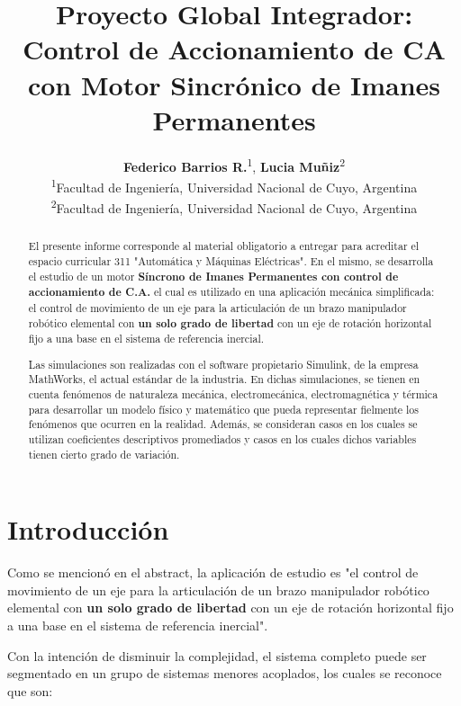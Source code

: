 \documentclass[blue,fullpaper]{ludusofficial}  %
\title{Proyecto Global Integrador: Control de Accionamiento de CA con Motor Sincrónico de Imanes Permanentes}
\author{%
    \textbf{Federico Barrios R.}\textsuperscript{1}, \textbf{Lucia Muñiz}\textsuperscript{2}\\[0.2cm]
    \mdseries\small\textsuperscript{1}Facultad de Ingeniería, Universidad Nacional de Cuyo, Argentina\\
    \small\textsuperscript{2}Facultad de Ingeniería, Universidad Nacional de Cuyo, Argentina \\
}
\begin{document}
\begin{abstract}
El presente informe corresponde al material obligatorio a entregar para acreditar el espacio curricular 311 "Automática y Máquinas Eléctricas". En el mismo, se desarrolla el estudio de un motor \textbf{Síncrono de Imanes Permanentes con control de accionamiento de C.A.} el cual es utilizado en una aplicación mecánica simplificada: el control de movimiento de un eje para la articulación de un brazo manipulador robótico elemental con \textbf{un solo grado de libertad} con un eje de rotación horizontal fijo a una base en el sistema de referencia inercial.

Las simulaciones son realizadas con el software propietario Simulink, de la empresa MathWorks, el actual estándar de la industria. En dichas simulaciones, se tienen en cuenta fenómenos de naturaleza mecánica, electromecánica, electromagnética y térmica para desarrollar un modelo físico y matemático que pueda representar fielmente los fenómenos que ocurren en la realidad. Además, se consideran casos en los cuales se utilizan coeficientes descriptivos promediados y casos en los cuales dichos variables tienen cierto grado de variación.

\end{abstract}


\maketitle

\onecolumn
\tableofcontents
\clearpage

\clearpage
\section{Introducción}

Como se mencionó en el abstract, la aplicación de estudio es "el control de movimiento de un eje para la articulación de un brazo manipulador robótico elemental con \textbf{un solo grado de libertad} con un eje de rotación horizontal fijo a una base en el sistema de referencia inercial".

Con la intención de disminuir la complejidad, el sistema completo puede ser segmentado en un grupo de sistemas menores acoplados, los cuales se reconoce que son:
\end{document}
